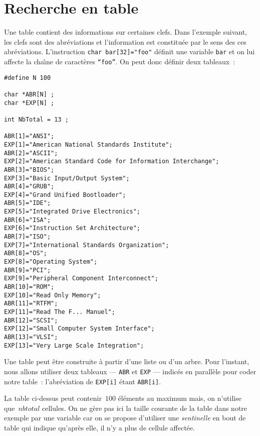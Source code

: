 \section{Recherche en table}
\label{sec:RechercheEntable}
Une table  contient   des informations  sur   certaines  clefs.   Dans
l'exemple suivant, les clefs  sont des abr\'eviations et l'information
est  constitu\'ee par le sens   des ces abr\'eviations.  L'instruction
\texttt{char bar[32]="foo"} d\'efinit une  variable \texttt{bar} et on
lui affecte la cha\^\i{}ne de  caract\`eres \texttt{``foo''}. On  peut
donc d\'efinir deux tableaux~:
\begin{verbatim}
#define N 100

char *ABR[N] ;
char *EXP[N] ;

int NbTotal = 13 ;

ABR[1]="ANSI";
EXP[1]="American National Standards Institute";
ABR[2]="ASCII";
EXP[2]="American Standard Code for Information Interchange";
ABR[3]="BIOS";
EXP[3]="Basic Input/Output System";
ABR[4]="GRUB";
EXP[4]="Grand Unified Bootloader";
ABR[5]="IDE";
EXP[5]="Integrated Drive Electronics";
ABR[6]="ISA";
EXP[6]="Instruction Set Architecture";
ABR[7]="ISO";
EXP[7]="International Standards Organization";
ABR[8]="OS";
EXP[8]="Operating System";
ABR[9]="PCI";
EXP[9]="Peripheral Component Interconnect";
ABR[10]="ROM";
EXP[10]="Read Only Memory";
ABR[11]="RTFM";
EXP[11]="Read The F... Manuel";
ABR[12]="SCSI";
EXP[12]="Small Computer System Interface";
ABR[13]="VLSI";
EXP[13]="Very Large Scale Integration";
\end{verbatim}
Une table peut \^etre construite \`a partir d'une liste ou d'un arbre.
Pour l'instant, nous allons utiliser deux tableaux --- \texttt{ABR} et
\texttt{EXP}  --- indic\'es en   parall\`ele pour coder  notre table~:
l'abr\'eviation de \texttt{EXP[i]} \'etant \texttt{ABR[i]}.
\par
La table ci-dessus  peut contenir~$100$ \'el\'ements au maximum  mais,
on n'utilise que~$nbtotal$  cellules.  On ne  g\`ere pas ici la taille
courante de  la table dans notre  exemple par une  variable car  on se
propose    d'utiliser une \textit{sentinelle}   en  bout  de table qui
indique qu'apr\`es elle, il n'y a plus de cellule affect\'ee.
